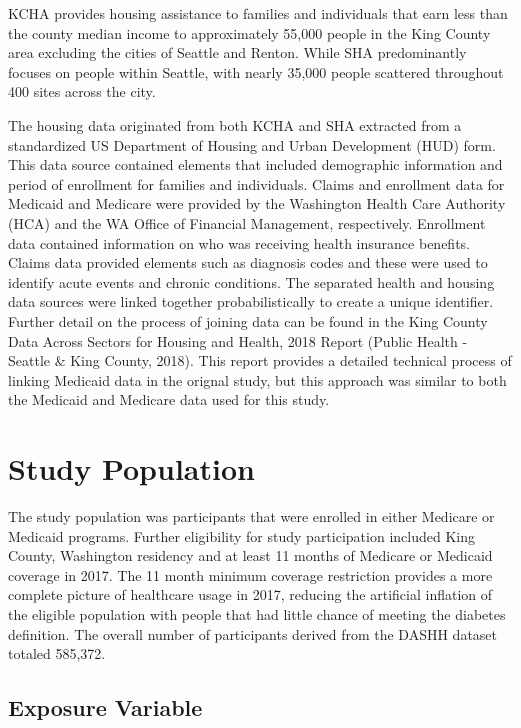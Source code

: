 \documentclass [11pt, proquest] {uwthesis}[2015/03/03]
\begin{document}
KCHA provides housing assistance to families and individuals that earn
less than the county median income to approximately 55,000 people in the
King County area excluding the cities of Seattle and Renton. While SHA
predominantly focuses on people within Seattle, with nearly 35,000
people scattered throughout 400 sites across the city.

The housing data originated from both KCHA and SHA extracted from a
standardized US Department of Housing and Urban Development (HUD) form.
This data source contained elements that included demographic
information and period of enrollment for families and individuals.
Claims and enrollment data for Medicaid and Medicare were provided by
the Washington Health Care Authority (HCA) and the WA Office of
Financial Management, respectively. Enrollment data contained
information on who was receiving health insurance benefits. Claims data
provided elements such as diagnosis codes and these were used to
identify acute events and chronic conditions. The separated health and
housing data sources were linked together probabilistically to create a
unique identifier. Further detail on the process of joining data can be
found in the King County Data Across Sectors for Housing and Health,
2018 Report (Public Health - Seattle \& King County, 2018). This report
provides a detailed technical process of linking Medicaid data in the
orignal study, but this approach was similar to both the Medicaid and
Medicare data used for this study.

\section{Study Population}\label{study-population}

The study population was participants that were enrolled in either
Medicare or Medicaid programs. Further eligibility for study
participation included King County, Washington residency and at least 11
months of Medicare or Medicaid coverage in 2017. The 11 month minimum
coverage restriction provides a more complete picture of healthcare
usage in 2017, reducing the artificial inflation of the eligible
population with people that had little chance of meeting the diabetes
definition. The overall number of participants derived from the DASHH
dataset totaled 585,372.

\subsection{Exposure Variable}\label{exposure-variable}
\end{document}
